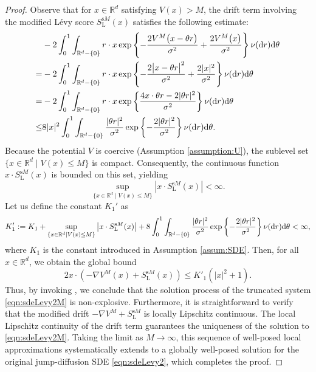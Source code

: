 \begin{proof}
Observe that for $x\in\mathbb{R}^d$ satisfying $V(x)>M$, the drift term involving the modified L\'{e}vy score $S^{\mathrm{s}M}_\mathrm{L}(x)$ satisfies the following estimate:
\begin{equation}
    \begin{aligned}
        & -2\int_0^1\int_{\mathbb{R}^d-\{0\}} r\cdot x\exp\left\{-\frac{2V^M\big(x - \theta r\big)}{\sigma^2} + \frac{2V^M\big(x \big)}{\sigma^2}\right\} \nu(\mathrm{d} r)\mathrm{d}\theta\\
        =& -2\int_0^1\int_{\mathbb{R}^d-\{0\}} r\cdot x\exp\left\{-\frac{2 \big|x - \theta r\big|^2}{\sigma^2} + \frac{2|x|^2}{\sigma^2} \right\} \nu(\mathrm{d} r)\mathrm{d}\theta\\
        =& -2\int_0^1\int_{\mathbb{R}^d-\{0\}} r\cdot x\exp\left\{ \frac{4 x \cdot \theta r - 2|\theta r|^2}{\sigma^2}  \right\} \nu(\mathrm{d} r)\mathrm{d}\theta\\
         \leq & 8|x|^2\int_0^1\int_{\mathbb{R}^d-\{0\}} \frac{  |\theta r|^2}{\sigma^2}\exp\left\{-  \frac{2|\theta r|^2}{\sigma^2} \right\} \nu(\mathrm{d} r)\mathrm{d}\theta.
    \end{aligned}
\end{equation}
Because the potential $V$ is coercive (Assumption \ref{assumption:U}), the sublevel set $\{x\in\mathbb{R}^d\mid V(x)\leq M\}$ is compact. Consequently, the continuous function $x\cdot S^{\mathrm{s}M}_\mathrm{L}(x)$ is bounded on this set, yielding
\begin{equation}
    \sup_{\{x\in\mathbb{R}^d\mid V(x)\leq M\}} \left| x\cdot S^{\mathrm{s}M}_\mathrm{L}(x)\right|<\infty.
\end{equation}
Let us define the constant $K_1'$ as
\begin{equation}
    K_1':= K_1 + \sup_{\{x\in\mathbb{R}^d\mid V(x)\leq M\}} \left| x\cdot S^{\mathrm{s}M}_\mathrm{L}(x)\right| + 8 \int_0^1\int_{\mathbb{R}^d-\{0\}} \frac{  |\theta r|^2}{\sigma^2}\exp\left\{-  \frac{2|\theta r|^2}{\sigma^2} \right\} \nu(\mathrm{d} r)\mathrm{d}\theta<\infty,
\end{equation}
where $K_1$ is the constant introduced in Assumption \ref{assum:SDE}. Then, for all $x\in\mathbb{R}^d$, we obtain the global bound
\begin{equation}
    2x\cdot \left(-\nabla V^M(x) + S^{\mathrm{s}M}_\mathrm{L}(x)\right)\leq K'_1(|x|^2 + 1).
\end{equation}
Thus, by invoking \cite[Theorem 2.2]{xi2019jump}, we conclude that the solution process of the truncated system \eqref{eqn:sdeLevy2M} is non-explosive. Furthermore, it is straightforward to verify that the modified drift $-\nabla V^M + S^{\mathrm{s}M}_\mathrm{L}$ is locally Lipschitz continuous. The local Lipschitz continuity of the drift term guarantees the uniqueness of the solution to \eqref{eqn:sdeLevy2M}. Taking the limit as $M\to\infty$, this sequence of well-posed local approximations systematically extends to a globally well-posed solution for the original jump-diffusion SDE \eqref{eqn:sdeLevy2}, which completes the proof.
\end{proof}

